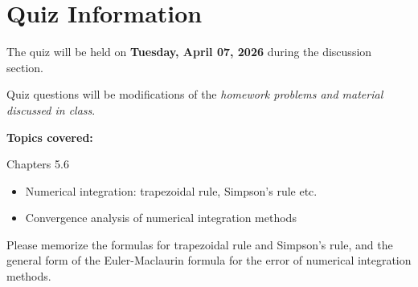\documentclass[reqno, answers]{exam}
\begin{document}
\section*{Quiz Information}

The quiz will be held on {\bf Tuesday, April 07, 2026} during the discussion section.

Quiz questions will be modifications of the {\it homework problems and material discussed in class}.

\textbf{Topics covered:}

Chapters 5.6

\begin{itemize}
  \item Numerical integration: trapezoidal rule, Simpson's rule etc.
  \item Convergence analysis of numerical integration methods
\end{itemize}

Please memorize the formulas for trapezoidal rule and Simpson's rule, and the general form of the Euler-Maclaurin formula for the error of numerical integration methods.
\end{document}
